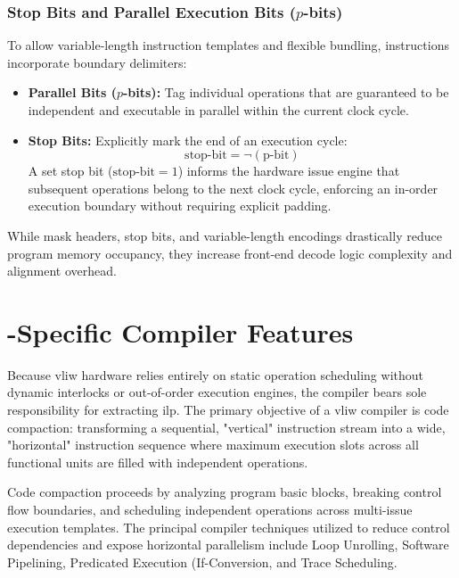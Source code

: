 \subsubsection{Stop Bits and Parallel Execution Bits ($p$-bits)}
To allow variable-length instruction templates and flexible bundling, instructions incorporate boundary delimiters:
\begin{itemize}
    \item \textbf{Parallel Bits ($p$-bits):} Tag individual operations that are guaranteed to be independent and executable in parallel within the current clock cycle.
    \item \textbf{Stop Bits:} Explicitly mark the end of an execution cycle:
    \begin{equation}
        \text{stop-bit} = \neg (\text{p-bit})
    \end{equation}
    A set stop bit ($\text{stop-bit} = 1$) informs the hardware issue engine that subsequent operations belong to the next clock cycle, enforcing an in-order execution boundary without requiring explicit padding.
\end{itemize}

While mask headers, stop bits, and variable-length encodings drastically reduce program memory occupancy, they increase front-end decode logic complexity and alignment overhead.

\section{-Specific Compiler Features}
\label{sec:vliw_compiler_features}

Because \gls{vliw} hardware relies entirely on static operation scheduling without dynamic interlocks or out-of-order execution engines, the compiler bears sole responsibility for extracting \gls{ilp}. The primary objective of a \gls{vliw} compiler is code compaction: transforming a sequential, "vertical" instruction stream into a wide, "horizontal" instruction sequence where maximum execution slots across all functional units are filled with independent operations.

Code compaction proceeds by analyzing program basic blocks, breaking control flow boundaries, and scheduling independent operations across multi-issue execution templates. The principal compiler techniques utilized to reduce control dependencies and expose horizontal parallelism include Loop Unrolling, Software Pipelining, Predicated Execution (If-Conversion, and Trace Scheduling.


